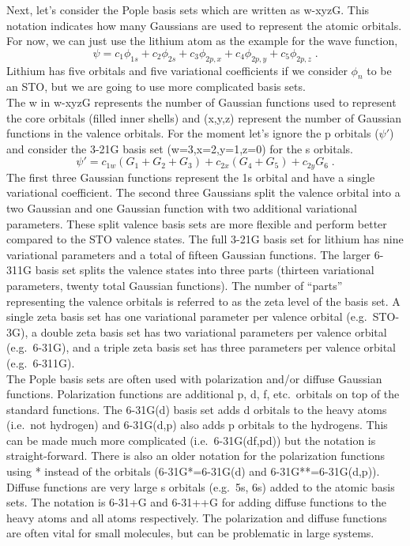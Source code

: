 \documentclass[12pt]{report}
\begin{document}
Next, let's consider the Pople basis sets which are written as w-xyzG.
This notation indicates how many Gaussians are used to represent the atomic
orbitals.
For now, we can just use the lithium atom as the example for the wave
function,
\begin{equation}
 \psi = c_1\phi_{1s} + c_2\phi_{2s} + c_3\phi_{2p,x} +
 c_4\phi_{2p,y} + c_5\phi_{2p,z} \; .
\end{equation}
Lithium has five orbitals and five variational coefficients if we consider
$\phi_n$ to be an STO, but we are going to use more complicated basis sets. \\

The w in w-xyzG represents the number of Gaussian functions used to represent
the core orbitals (filled inner shells) and (x,y,z) represent the number of
Gaussian functions in the valence orbitals.
For the moment let's ignore the p orbitals ($\psi'$) and consider the 3-21G
basis set (w=3,x=2,y=1,z=0) for the s orbitals.
\begin{equation}
 \psi' = c_{1w}(G_1+G_2+G_3)+c_{2x}(G_4+G_5)+c_{2y}G_6 \; .
\end{equation}
The first three Gaussian functions represent the 1s orbital and have a single
variational coefficient.
The second three Gaussians split the valence orbital into a two Gaussian and
one Gaussian function with two additional variational parameters.
These split valence basis sets are more flexible and perform better compared
to the STO valence states.
The full 3-21G basis set for lithium has nine variational parameters and a
total of fifteen Gaussian functions.
The larger 6-311G basis set splits the valence states into three parts
(thirteen variational parameters, twenty total Gaussian functions).
The number of ``parts'' representing the valence orbitals is referred to as
the zeta level of the basis set.
A single zeta basis set has one variational parameter per valence orbital
(e.g.\ STO-3G), a double zeta basis set has two variational parameters per
valence orbital (e.g.\ 6-31G), and a triple zeta basis set has three parameters
per valence orbital (e.g.\ 6-311G). \\

The Pople basis sets are often used with polarization and/or diffuse Gaussian
functions.
Polarization functions are additional p, d, f, etc.\ orbitals on top of the
standard functions.
The 6-31G(d) basis set adds d orbitals to the heavy atoms (i.e.\ not hydrogen)
and 6-31G(d,p) also adds p orbitals to the hydrogens.
This can be made much more complicated (i.e.\ 6-31G(df,pd)) but the notation is
straight-forward.
There is also an older notation for the polarization functions using * instead
of the orbitals (6-31G*=6-31G(d) and 6-31G**=6-31G(d,p)).
Diffuse functions are very large s orbitals (e.g.\ 5s, 6s) added to the atomic
basis sets.
The notation is 6-31+G and 6-31++G for adding diffuse functions to the heavy
atoms and all atoms respectively.
The polarization and diffuse functions are often vital for small molecules,
but can be problematic in large systems. \\
\end{document}
